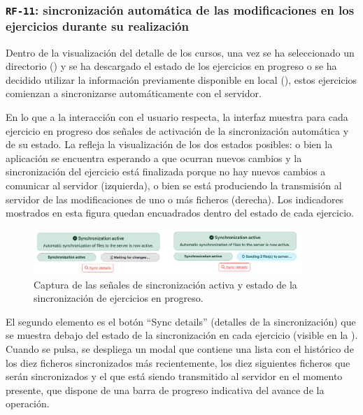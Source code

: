 \subsubsection{\texttt{RF-11}: sincronización automática de las modificaciones en los ejercicios durante su realización}
\label{subsec:rf11}

Dentro de la visualización del detalle de los cursos, una vez se ha seleccionado un directorio () y se ha descargado el estado de los ejercicios en progreso o se ha decidido utilizar la información previamente disponible en local (), estos ejercicios comienzan a sincronizarse automáticamente con el servidor.

En lo que a la interacción con el usuario respecta, la interfaz muestra para cada ejercicio en progreso dos señales de activación de la sincronización automática y de su estado. La  refleja la visualización de los dos estados posibles: o bien la aplicación se encuentra esperando a que ocurran nuevos cambios y la sincronización del ejercicio está finalizada porque no hay nuevos cambios a comunicar al servidor (izquierda), o bien se está produciendo la transmisión al servidor de las modificaciones de uno o más ficheros (derecha). Los indicadores mostrados en esta figura quedan encuadrados dentro del estado de cada ejercicio.

\begin{figure}[ht]
    \centering
    \includegraphics[width=0.9\textwidth]{imagenes/utilizadas/4-3-implementacion/rf11-1.png}
    \caption{Captura de las señales de sincronización activa y estado de la sincronización de ejercicios en progreso.}
    \label{fig:reqf11-1}
\end{figure}

El segundo elemento es el botón ``Sync details'' (detalles de la sincronización) que se muestra debajo del estado de la sincronización en cada ejercicio (visible en la ). Cuando se pulsa, se despliega un modal que contiene una lista con el histórico de los diez ficheros sincronizados más recientemente, los diez siguientes ficheros que serán sincronizados y el que está siendo transmitido al servidor en el momento presente, que dispone de una barra de progreso indicativa del avance de la operación.

